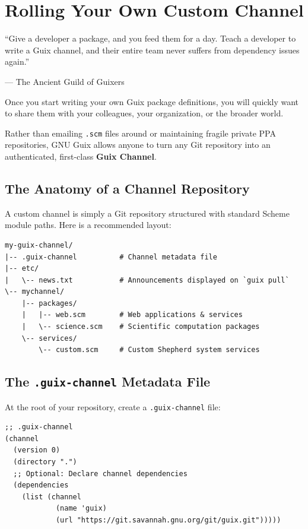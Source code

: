 \chapter{Rolling Your Own Custom Channel}
\label{chap:custom-channels}

\epigraph{``Give a developer a package, and you feed them for a day. Teach a developer to write a Guix channel, and their entire team never suffers from dependency issues again.''}{--- The Ancient Guild of Guixers}

\noindent
Once you start writing your own Guix package definitions, you will quickly want to share them with your colleagues, your organization, or the broader world.

Rather than emailing \texttt{.scm} files around or maintaining fragile private PPA repositories, GNU Guix allows anyone to turn any Git repository into an authenticated, first-class \textbf{Guix Channel}.

\section{The Anatomy of a Channel Repository}

A custom channel is simply a Git repository structured with standard Scheme module paths. Here is a recommended layout:

\begin{lstlisting}[style=guixcli]
my-guix-channel/
|-- .guix-channel          # Channel metadata file
|-- etc/
|   \-- news.txt           # Announcements displayed on `guix pull`
\-- mychannel/
    |-- packages/
    |   |-- web.scm        # Web applications & services
    |   \-- science.scm    # Scientific computation packages
    \-- services/
        \-- custom.scm     # Custom Shepherd system services
\end{lstlisting}

\section{The \texttt{.guix-channel} Metadata File}

At the root of your repository, create a \texttt{.guix-channel} file:

\begin{lstlisting}[style=guixscheme]
;; .guix-channel
(channel
  (version 0)
  (directory ".")
  ;; Optional: Declare channel dependencies
  (dependencies
    (list (channel
            (name 'guix)
            (url "https://git.savannah.gnu.org/git/guix.git")))))
\end{lstlisting}

